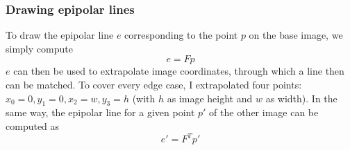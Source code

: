 \documentclass{paper}
\begin{document}
\subsubsection{Drawing epipolar lines}
To draw the epipolar line $e$ corresponding to the point $p$ on the base image, we simply compute
\begin{equation}
	e = F p
\end{equation}
$e$ can then be used to extrapolate image coordinates, through which a line then can be matched. 
To cover every edge case, I extrapolated four points: $x_0 = 0, y_1 = 0, x_2 = w, y_3 = h$ (with $h$ as image height and $w$ as width). 
In the same way, the epipolar line for a given point $p'$ of the other image can be computed as
\begin{equation}
	e' = F^Tp'
\end{equation} 
\end{document}
